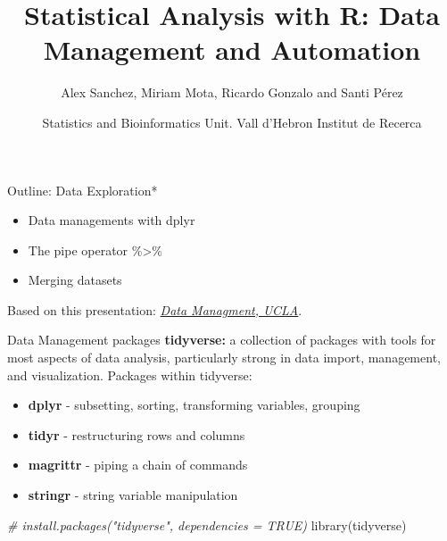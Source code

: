 \documentclass[
  ignorenonframetext,
]{beamer}
\title{Statistical Analysis with R: Data Management and Automation}
\author{Alex Sanchez, Miriam Mota, Ricardo Gonzalo and Santi Pérez}
\date{Statistics and Bioinformatics Unit. Vall d'Hebron Institut de
Recerca}
\newenvironment{Shaded}{\begin{snugshade}}{\end{snugshade}}
\newcommand{\CommentTok}[1]{\textcolor[rgb]{0.56,0.35,0.01}{\textit{#1}}}
\newcommand{\FunctionTok}[1]{\textcolor[rgb]{0.00,0.00,0.00}{#1}}
\newcommand{\NormalTok}[1]{#1}
\providecommand{\tightlist}{%
  \setlength{\itemsep}{0pt}\setlength{\parskip}{0pt}}
\begin{document}
\frame{\titlepage}

\begin{frame}{Outline: Data Exploration*}
\protect\hypertarget{outline-data-exploration}{}
\vspace{2cm}

\begin{itemize}
\tightlist
\item
  Data managements with dplyr
\item
  The pipe operator \%\textgreater\%
\item
  Merging datasets
\end{itemize}

\vspace{2.5cm}

\tiny *Based on this presentation:
\href{https://stats.idre.ucla.edu/stat/data/rdm/data_management_seminar.html\#153}{\emph{Data
Managment, UCLA}}.
\end{frame}

\begin{frame}[fragile]{Data Management packages}
\protect\hypertarget{data-management-packages}{}
\textbf{tidyverse:} a collection of packages with tools for most aspects
of data analysis, particularly strong in data import, management, and
visualization. Packages within tidyverse:

\begin{itemize}
\tightlist
\item
  \textbf{dplyr} - subsetting, sorting, transforming variables, grouping
\item
  \textbf{tidyr} - restructuring rows and columns
\item
  \textbf{magrittr} - piping a chain of commands
\item
  \textbf{stringr} - string variable manipulation
\end{itemize}

\footnotesize

\begin{Shaded}
\begin{Highlighting}[]
\CommentTok{\# install.packages("tidyverse", dependencies = TRUE)}
\FunctionTok{library}\NormalTok{(tidyverse)}
\end{Highlighting}
\end{Shaded}

\normalsize
\end{frame}
\end{document}
